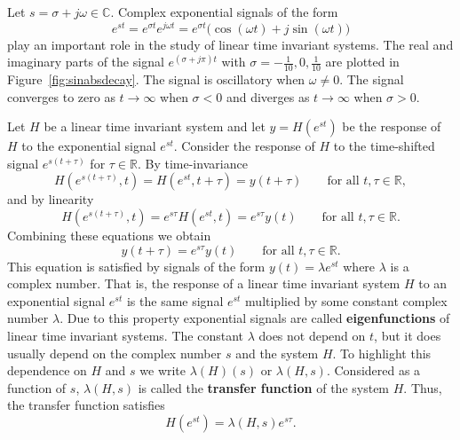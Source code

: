 \documentclass[11pt,a4paper]{book}
\theoremstyle{plain}
\numberwithin{equation}{section}
\newcommand{\reals}{{\mathbb R}}
\newcommand{\complex}{{\mathbb C}}
\newcommand{\term}{\textbf}
\begin{document}
Let $s = \sigma + j \omega \in \complex$.  Complex exponential signals of the form 
\[
e^{st} = e^{\sigma t}e^{j \omega t} = e^{\sigma t} \big( \cos(\omega t) + j \sin(\omega t) \big)
\]
play an important role in the study of linear time invariant systems.  The real and imaginary parts of the signal $e^{(\sigma + j\pi)t}$ with $\sigma = -\tfrac{1}{10},0,\tfrac{1}{10}$ are plotted in Figure~\ref{fig:sinabsdecay}.  The signal is oscillatory when $\omega \neq 0$.  The signal converges to zero as $t\to\infty$ when $\sigma<0$ and diverges as $t\to\infty$ when $\sigma > 0$.  

Let $H$ be a linear time invariant system and let $y = H(e^{st})$ be the response of $H$ to the exponential signal $e^{st}$.  Consider the response of $H$ to the time-shifted signal $e^{s(t+\tau)}$ for $\tau \in \reals$.  By time-invariance
\[
H(e^{s(t+\tau)},t) = H(e^{st}, t+\tau) = y(t + \tau) \qquad \text{for all $t, \tau \in \reals$},
\]
and by linearity
\[
H(e^{s(t+\tau)},t) = e^{s\tau} H(e^{st}, t)  = e^{s\tau} y(t) \qquad \text{for all $t, \tau \in \reals$}.
\]
Combining these equations we obtain
\[
y(t + \tau) = e^{s\tau} y(t) \qquad \text{for all $t,\tau \in \reals$}.
\]
This equation is satisfied by signals of the form $y(t) = \lambda e^{st}$ where $\lambda$ is a complex number.  That is, the response of a linear time invariant system $H$ to an exponential signal $e^{st}$ is the same signal $e^{st}$ multiplied by some constant complex number $\lambda$.  Due to this property exponential signals are called \term{eigenfunctions} of linear time invariant systems.  The constant $\lambda$ does not depend on $t$, but it does usually depend on the complex number $s$ and the system $H$.  To highlight this dependence on $H$ and $s$ we write $\lambda(H)(s)$ or $\lambda(H,s)$.  Considered as a function of $s$, $\lambda(H,s)$ is called the \term{transfer function} of the system $H$. 
Thus, the transfer function satisfies
\begin{equation}\label{eq:transfuneigenproperty}
H(e^{st}) = \lambda(H,s) e^{s\tau}  .
\end{equation}

\end{document}
